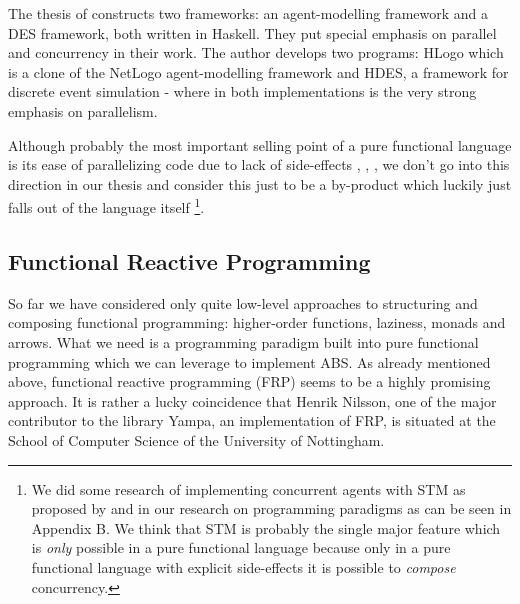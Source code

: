The thesis of \cite{bezirgiannis_improving_2013} constructs two frameworks: an agent-modelling framework and a DES framework, both written in Haskell. They put special emphasis on parallel and concurrency in their work. The author develops two programs: HLogo which is a clone of the NetLogo agent-modelling framework and HDES, a framework for discrete event simulation - where in both implementations is the very strong emphasis on parallelism.

Although probably the most important selling point of a pure functional language is its ease of parallelizing code due to lack of side-effects \cite{peyton_jones_concurrent_1996}, \cite{osullivan_real_2008}, \cite{jones_tutorial_2009}, \cite{marlow_parallel_2013} we don't go into this direction in our thesis and consider this just to be a by-product which luckily just falls out of the language itself \footnote{We did some research of implementing concurrent agents with STM as proposed by \cite{sweeney_next_2006} and \cite{bezirgiannis_improving_2013} in our research on programming paradigms as can be seen in Appendix B. We think that STM is probably the single major feature which is \textit{only} possible in a pure functional language because only in a pure functional language with explicit side-effects it is possible to \textit{compose} concurrency.}.


\subsection{Functional Reactive Programming}
So far we have considered only quite low-level approaches to structuring and composing functional programming: higher-order functions, laziness, monads and arrows. What we need is a programming paradigm built into pure functional programming which we can leverage to implement ABS. As already mentioned above, functional reactive programming (FRP) seems to be a highly promising approach. It is rather a lucky coincidence that Henrik Nilsson, one of the major contributor to the library Yampa, an implementation of FRP, is situated at the School of Computer Science of the University of Nottingham.

